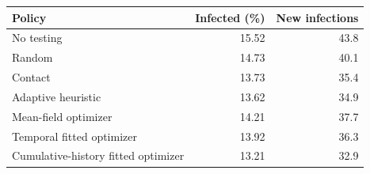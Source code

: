 \begin{tabular}{lrr}\toprule
Policy & Infected (\%) & New infections \\ \midrule
No testing & 15.52 & 43.8 \\
Random & 14.73 & 40.1 \\
Contact & 13.73 & 35.4 \\
Adaptive heuristic & 13.62 & 34.9 \\
Mean-field optimizer & 14.21 & 37.7 \\
Temporal fitted optimizer & 13.92 & 36.3 \\
Cumulative-history fitted optimizer & 13.21 & 32.9 \\
\bottomrule\end{tabular}